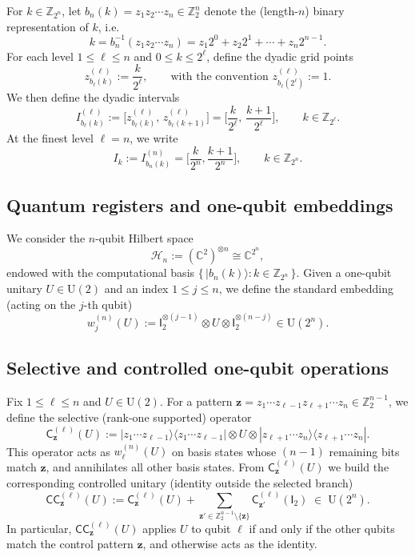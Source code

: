 \documentclass{article}
\newcommand{\CC}{\mathsf{C}\mathsf{C}}
\newcommand{\rI}{\mathsf{I}}
\newcommand{\rC}{\mathsf{C}}
\numberwithin{equation}{section}
\begin{document}
For $k\in\mathbb{Z}_{2^n}$, let $b_n(k)=z_1z_2\cdots z_n\in\mathbb{Z}_2^n$ denote the
(length-$n$) binary representation of $k$, i.e.
\[
k=b_n^{-1}(z_1z_2\cdots z_n) = z_1 2^0+z_2 2^1+\cdots+z_n 2^{n-1}.
\]
For each level $1\le \ell\le n$ and $0\le k\le 2^\ell$, define the dyadic grid points
\[
z^{(\ell)}_{b_\ell(k)}:=\frac{k}{2^\ell},
\qquad\text{with the convention } z^{(\ell)}_{b_\ell(2^\ell)}:=1.
\]
We then define the dyadic intervals
\[
I^{(\ell)}_{b_\ell(k)}:=\Big[z^{(\ell)}_{b_\ell(k)},\,z^{(\ell)}_{b_\ell(k+1)}\Big]
=\Big[\frac{k}{2^\ell},\,\frac{k+1}{2^\ell}\Big],
\qquad k\in\mathbb{Z}_{2^\ell}.
\]
At the finest level $\ell=n$, we write
\[
I_k:=I^{(n)}_{b_n(k)}=\Big[\frac{k}{2^n},\frac{k+1}{2^n}\Big],\qquad k\in\mathbb{Z}_{2^n}.
\]

\subsection{Quantum registers and one-qubit embeddings}\label{subsec:registers}

We consider the $n$-qubit Hilbert space
\[
\mathcal{H}_n:=(\mathbb{C}^2)^{\otimes n}\cong \mathbb{C}^{2^n},
\]
endowed with the computational basis $\{\,|b_n(k)\rangle: k\in\mathbb{Z}_{2^n}\,\}$.
Given a one-qubit unitary $U\in \mathrm{U}(2)$ and an index $1\le j\le n$, we define
the standard embedding (acting on the $j$-th qubit)
\[
w_j^{(n)}(U):=\rI_2^{\otimes (j-1)}\otimes U\otimes \rI_2^{\otimes (n-j)}\in \mathrm{U}(2^n).
\]

\subsection{Selective and controlled one-qubit operations}\label{subsec:controlled}

Fix $1\le \ell\le n$ and $U\in\mathrm{U}(2)$. For a pattern
$\mathbf{z}=z_1\cdots z_{\ell-1}z_{\ell+1}\cdots z_n\in\mathbb{Z}_2^{n-1}$,
we define the selective (rank-one supported) operator
\[
\rC^{(\ell)}_{\mathbf{z}}(U)
:=
|z_1\cdots z_{\ell-1}\rangle\langle z_1\cdots z_{\ell-1}|
\otimes U\otimes
|z_{\ell+1}\cdots z_n\rangle\langle z_{\ell+1}\cdots z_n|.
\]
This operator acts as $w_\ell^{(n)}(U)$ on basis states whose $(n-1)$ remaining bits
match $\mathbf{z}$, and annihilates all other basis states. From $\rC^{(\ell)}_{\mathbf{z}}(U)$
we build the corresponding controlled unitary (identity outside the selected branch)
\[
\CC^{(\ell)}_{\mathbf{z}}(U)
:=
\rC^{(\ell)}_{\mathbf{z}}(U)+
\sum_{\mathbf{z}'\in\mathbb{Z}_2^{n-1}\setminus\{\mathbf{z}\}}
\rC^{(\ell)}_{\mathbf{z}'}(\rI_2)
\;\in\;\mathrm{U}(2^n).
\]
In particular, $\CC^{(\ell)}_{\mathbf{z}}(U)$ applies $U$ to qubit $\ell$ if and only if the other
qubits match the control pattern $\mathbf{z}$, and otherwise acts as the identity.
\end{document}
